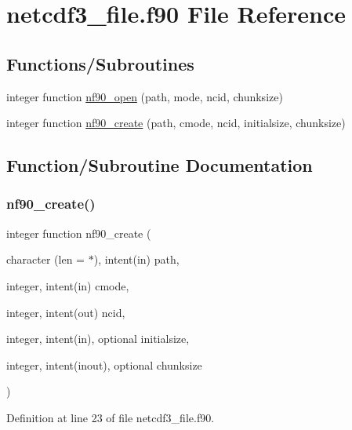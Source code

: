 \hypertarget{netcdf3__file_8f90}{}\section{netcdf3\+\_\+file.\+f90 File Reference}
\label{netcdf3__file_8f90}
\subsection*{Functions/\+Subroutines}
\begin{DoxyCompactItemize}
\item 
integer function \hyperlink{netcdf3__file_8f90_ab845345239658f63b7e99d7700c1ad98}{nf90\+\_\+open} (path, mode, ncid, chunksize)
\item 
integer function \hyperlink{netcdf3__file_8f90_ac996e5cab16ab98594fa4178f74e8db8}{nf90\+\_\+create} (path, cmode, ncid, initialsize, chunksize)
\end{DoxyCompactItemize}


\subsection{Function/\+Subroutine Documentation}
\mbox{\label{netcdf3__file_8f90_ac996e5cab16ab98594fa4178f74e8db8}} 
\subsubsection{\texorpdfstring{nf90\+\_\+create()}{nf90\_create()}}
{\footnotesize\ttfamily integer function nf90\+\_\+create (\begin{DoxyParamCaption}\item[{character (len = $\ast$), intent(in)}]{path,  }\item[{integer, intent(in)}]{cmode,  }\item[{integer, intent(out)}]{ncid,  }\item[{integer, intent(in), optional}]{initialsize,  }\item[{integer, intent(inout), optional}]{chunksize }\end{DoxyParamCaption})}



Definition at line 23 of file netcdf3\+\_\+file.\+f90.

